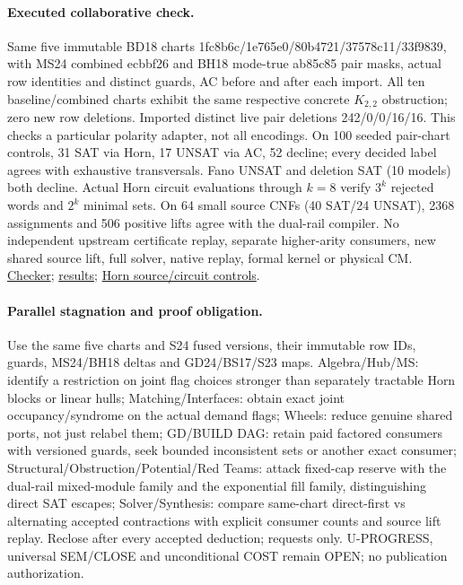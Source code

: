 \documentclass[11pt]{article}
\begin{document}
\paragraph{Executed collaborative check.}
Same five immutable BD18 charts 1fc8b6c/1e765e0/80b4721/37578c11/33f9839, with MS24 combined ecbbf26 and BH18 mode-true ab85c85 pair masks, actual row identities and distinct guards, AC before and after each import. All ten baseline/combined charts exhibit the same respective concrete $K_{2,2}$ obstruction; zero new row deletions. Imported distinct live pair deletions 242/0/0/16/16. This checks a particular polarity adapter, not all encodings. On 100 seeded pair-chart controls, 31 SAT via Horn, 17 UNSAT via AC, 52 decline; every decided label agrees with exhaustive transversals. Fano UNSAT and deletion SAT (10 models) both decline. Actual Horn circuit evaluations through $k=8$ verify $3^k$ rejected words and $2^k$ minimal sets. On 64 small source CNFs (40 SAT/24 UNSAT), 2368 assignments and 506 positive lifts agree with the dual-rail compiler. No independent upstream certificate replay, separate higher-arity consumers, new shared source lift, full solver, native replay, formal kernel or physical CM. \href{https://github.com/j15marti/pnp/commit/a4e38985706200c0a10e79baebccdb2ac6bcd6c6}{Checker}; \href{https://github.com/j15marti/pnp/commit/77172221ffe89cf413be7e257ddbe53e16492e63}{results}; \href{https://github.com/j15marti/pnp/commit/191aaca2ddeed659ba6c327bbc9e25b13fc8d276}{Horn source/circuit controls}.

\paragraph{Parallel stagnation and proof obligation.}
Use the same five charts and S24 fused versions, their immutable row IDs, guards, MS24/BH18 deltas and GD24/BS17/S23 maps. Algebra/Hub/MS: identify a restriction on joint flag choices stronger than separately tractable Horn blocks or linear hulls; Matching/Interfaces: obtain exact joint occupancy/syndrome on the actual demand flags; Wheels: reduce genuine shared ports, not just relabel them; GD/BUILD DAG: retain paid factored consumers with versioned guards, seek bounded inconsistent sets or another exact consumer; Structural/Obstruction/Potential/Red Teams: attack fixed-cap reserve with the dual-rail mixed-module family and the exponential fill family, distinguishing direct SAT escapes; Solver/Synthesis: compare same-chart direct-first vs alternating accepted contractions with explicit consumer counts and source lift replay. Reclose after every accepted deduction; requests only. U-PROGRESS, universal SEM/CLOSE and unconditional COST remain OPEN; no publication authorization.
\end{document}
